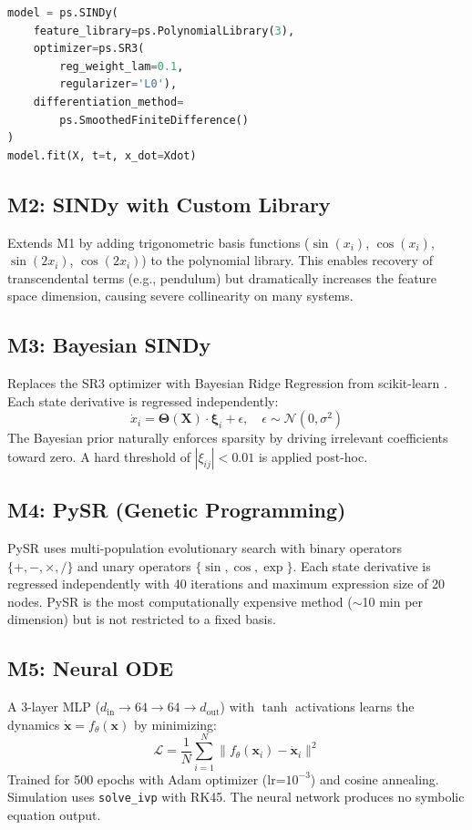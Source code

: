 \documentclass[conference]{IEEEtran}
\begin{document}
\begin{lstlisting}[language=Python, caption={M1 Implementation (sindy\_poly.py)}]
model = ps.SINDy(
    feature_library=ps.PolynomialLibrary(3),
    optimizer=ps.SR3(
        reg_weight_lam=0.1, 
        regularizer='L0'),
    differentiation_method=
        ps.SmoothedFiniteDifference()
)
model.fit(X, t=t, x_dot=Xdot)
\end{lstlisting}

\subsection{M2: SINDy with Custom Library}
Extends M1 by adding trigonometric basis functions ($\sin(x_i)$, $\cos(x_i)$, $\sin(2x_i)$, $\cos(2x_i)$) to the polynomial library. This enables recovery of transcendental terms (e.g., pendulum) but dramatically increases the feature space dimension, causing severe collinearity on many systems.

\subsection{M3: Bayesian SINDy}
Replaces the SR3 optimizer with Bayesian Ridge Regression from scikit-learn \cite{tipping2001}. Each state derivative is regressed independently:
\begin{equation}
\dot{x}_i = \boldsymbol{\Theta}(\mathbf{X}) \cdot \boldsymbol{\xi}_i + \epsilon, \quad \epsilon \sim \mathcal{N}(0, \sigma^2)
\end{equation}
The Bayesian prior naturally enforces sparsity by driving irrelevant coefficients toward zero. A hard threshold of $|\xi_{ij}| < 0.01$ is applied post-hoc.

\subsection{M4: PySR (Genetic Programming)}
PySR \cite{cranmer2023} uses multi-population evolutionary search with binary operators $\{+, -, \times, /\}$ and unary operators $\{\sin, \cos, \exp\}$. Each state derivative is regressed independently with 40 iterations and maximum expression size of 20 nodes. PySR is the most computationally expensive method ($\sim$10 min per dimension) but is not restricted to a fixed basis.

\subsection{M5: Neural ODE}
A 3-layer MLP ($d_\text{in} \to 64 \to 64 \to d_\text{out}$) with $\tanh$ activations learns the dynamics $\dot{\mathbf{x}} = f_\theta(\mathbf{x})$ by minimizing:
\begin{equation}
\mathcal{L} = \frac{1}{N}\sum_{i=1}^{N} \|f_\theta(\mathbf{x}_i) - \dot{\mathbf{x}}_i\|^2
\end{equation}
Trained for 500 epochs with Adam optimizer (lr=$10^{-3}$) and cosine annealing. Simulation uses \texttt{solve\_ivp} with RK45. The neural network produces no symbolic equation output.
\end{document}
